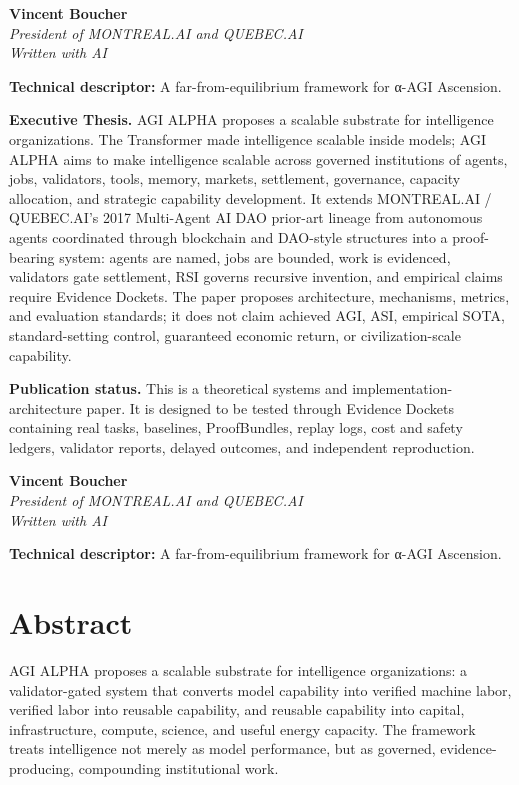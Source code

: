 \textbf{Vincent Boucher}\\
\emph{President of MONTREAL.AI and QUEBEC.AI}\\
\emph{Written with AI}

\textbf{Technical descriptor:} A far-from-equilibrium framework for
α-AGI Ascension.

\textbf{Executive Thesis.} AGI ALPHA proposes a scalable substrate for
intelligence organizations. The Transformer made intelligence scalable
inside models; AGI ALPHA aims to make intelligence scalable across
governed institutions of agents, jobs, validators, tools, memory,
markets, settlement, governance, capacity allocation, and strategic
capability development. It extends MONTREAL.AI / QUEBEC.AI's 2017
Multi-Agent AI DAO prior-art lineage from autonomous agents coordinated
through blockchain and DAO-style structures into a proof-bearing system:
agents are named, jobs are bounded, work is evidenced, validators gate
settlement, RSI governs recursive invention, and empirical claims
require Evidence Dockets. The paper proposes architecture, mechanisms,
metrics, and evaluation standards; it does not claim achieved AGI, ASI,
empirical SOTA, standard-setting control, guaranteed economic return, or
civilization-scale capability.

\textbf{Publication status.} This is a theoretical systems and
implementation-architecture paper. It is designed to be tested through
Evidence Dockets containing real tasks, baselines, ProofBundles, replay
logs, cost and safety ledgers, validator reports, delayed outcomes, and
independent reproduction.

\textbf{Vincent Boucher}\\
\emph{President of MONTREAL.AI and QUEBEC.AI}\\
\emph{Written with AI}

\textbf{Technical descriptor:} A far-from-equilibrium framework for
α-AGI Ascension.

\section{Abstract}\label{abstract}

AGI ALPHA proposes a scalable substrate for intelligence organizations:
a validator-gated system that converts model capability into verified
machine labor, verified labor into reusable capability, and reusable
capability into capital, infrastructure, compute, science, and useful
energy capacity. The framework treats intelligence not merely as model
performance, but as governed, evidence-producing, compounding
institutional work.

